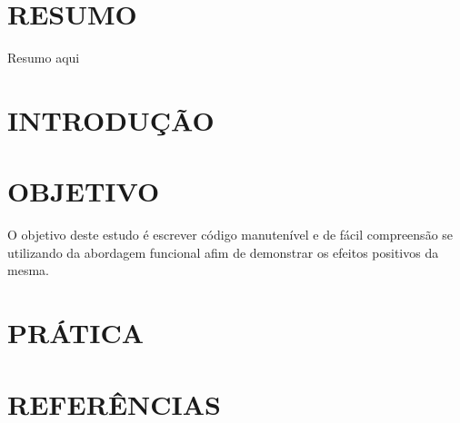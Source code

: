 \documentclass[date,twocolumn,a4paper]{ppgem}
\begin{document}
    \thispagestyle{plain}
    \makeheader

    \newcommand{\listoffiguras}{\listof{figlisting}{Lista de Figuras}} %

    \newcommand{\listofcodigos}{\lstlistoflistings} %


    \section*{RESUMO}
    Resumo aqui

    \section{INTRODUÇÃO}


    \section{OBJETIVO}
    O objetivo deste estudo é escrever código manutenível e de fácil compreensão se utilizando da abordagem funcional
    afim de demonstrar os efeitos positivos da mesma.

    

    
    
    \section{PRÁTICA}

    

    

    

    
    
    \section{REFERÊNCIAS}\\
    

    
\end{document}
